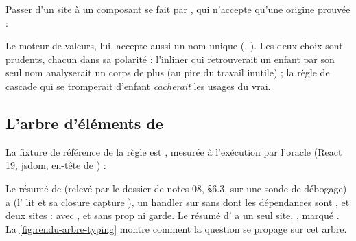 Passer d'un site à un composant se fait par , qui n'accepte qu'une origine prouvée :


Le moteur de valeurs, lui, accepte aussi un nom unique (, ). Les deux
choix sont prudents, chacun dans sa polarité : l'inliner qui retrouverait un enfant par son seul
nom analyserait un corps de plus (au pire du travail inutile) ; la règle de cascade qui se
tromperait d'enfant \emph{cacherait} les usages du vrai.

\subsection{L'arbre d'éléments de }

La fixture de référence de la règle est ,
mesurée à l'exécution par l'oracle  (React 19, jsdom, en-tête de
) :


Le résumé de  (relevé par le dossier de notes 08, §6.3, sur une sonde de débogage) a
 (l' lit  et sa closure capture
), un handler  sur  sans  dont les dépendances
sont , et deux sites :  avec , et
 sans prop ni garde. Le résumé d' a un seul site,
, marqué . La \cref{fig:rendu-arbre-typing} montre comment la question
 se propage sur cet arbre.

